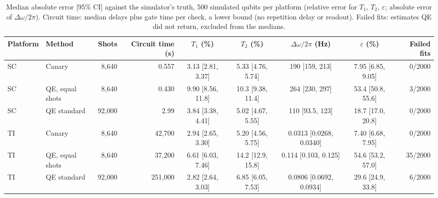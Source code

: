\begin{table}[!t]
\centering
\footnotesize
\caption{Median absolute error [95\% CI] against the simulator's truth, 500 simulated qubits per platform (relative error for $T_1$, $T_2$, $\varepsilon$; absolute error of $\Delta\omega/2\pi$). Circuit time: median delays plus gate time per check, a lower bound (no repetition delay or readout). Failed fits: estimates QE did not return, excluded from the medians.}
\label{tab:nisq}
\begin{adjustbox}{max width=\linewidth}
\begin{tabular}{llrrccccr}
\hline
Platform & Method & Shots & Circuit time (s) & $T_1$ (\%) & $T_2$ (\%) & $\Delta\omega/2\pi$ (Hz) & $\varepsilon$ (\%) & Failed fits \\
\hline
SC & Canary & 8,640 & 0.557 & 3.13 [2.81, 3.37] & 5.33 [4.76, 5.74] & 190 [159, 213] & 7.95 [6.85, 9.05] & 0/2000 \\
SC & QE, equal shots & 8,640 & 0.430 & 9.90 [8.56, 11.8] & 10.3 [9.38, 11.4] & 264 [230, 297] & 53.4 [50.8, 55.6] & 3/2000 \\
SC & QE standard & 92,000 & 2.99 & 3.84 [3.38, 4.41] & 5.02 [4.67, 5.55] & 110 [93.5, 123] & 18.7 [17.0, 20.8] & 0/2000 \\
\hline
TI & Canary & 8,640 & 42,700 & 2.94 [2.65, 3.30] & 5.20 [4.56, 5.75] & 0.0313 [0.0268, 0.0340] & 7.40 [6.68, 7.95] & 0/2000 \\
TI & QE, equal shots & 8,640 & 37,200 & 6.61 [6.03, 7.46] & 14.2 [12.9, 15.8] & 0.114 [0.103, 0.125] & 54.6 [53.2, 57.0] & 35/2000 \\
TI & QE standard & 92,000 & 251,000 & 2.82 [2.64, 3.03] & 6.85 [6.05, 7.53] & 0.0806 [0.0692, 0.0934] & 29.6 [24.9, 33.8] & 6/2000 \\
\hline
\end{tabular}
\end{adjustbox}
\end{table}
